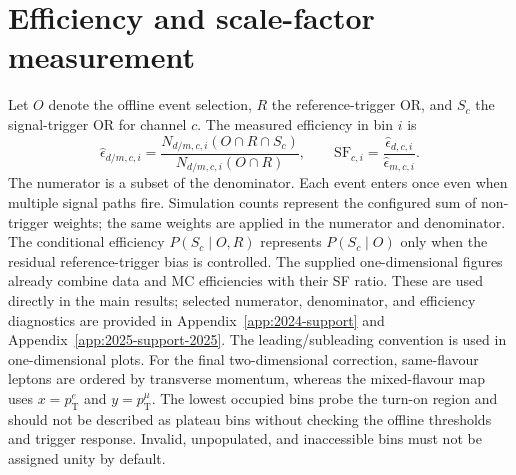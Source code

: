 \section{Efficiency and scale-factor measurement}\label{sec:method}
Let $O$ denote the offline event selection, $R$ the reference-trigger OR, and $S_c$ the signal-trigger OR for channel $c$. The measured efficiency in bin $i$ is
\begin{equation}\label{eq:eff}
\widehat\epsilon_{d/m,c,i}=\frac{N_{d/m,c,i}(O\cap R\cap S_c)}{N_{d/m,c,i}(O\cap R)},\qquad
\mathrm{SF}_{c,i}=\frac{\widehat\epsilon_{d,c,i}}{\widehat\epsilon_{m,c,i}}.
\end{equation}
The numerator is a subset of the denominator. Each event enters once even when multiple signal paths fire. Simulation counts represent the configured sum of non-trigger weights; the same weights are applied in the numerator and denominator. The conditional efficiency $P(S_c\mid O,R)$ represents $P(S_c\mid O)$ only when the residual reference-trigger bias is controlled.
The supplied one-dimensional figures already combine data and MC efficiencies with their SF ratio. These are used directly in the main results; selected numerator, denominator, and efficiency diagnostics are provided in Appendix~\ref{app:2024-support} and Appendix~\ref{app:2025-support-2025}. The leading/subleading convention is used in one-dimensional plots. For the final two-dimensional correction, same-flavour leptons are ordered by transverse momentum, whereas the mixed-flavour map uses $x=p_{\mathrm T}^{e}$ and $y=p_{\mathrm T}^{\mu}$.
The lowest occupied bins probe the turn-on region and should not be described as plateau bins without checking the offline thresholds and trigger response. Invalid, unpopulated, and inaccessible bins must not be assigned unity by default.
